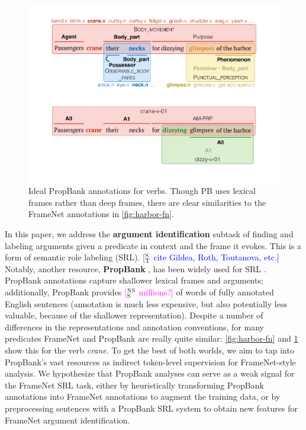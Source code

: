\documentclass[11pt,a4paper]{article}
\newcommand{\ensuretext}[1]{#1}
\newcommand{\nssmarker}{\ensuretext{\textcolor{magenta}{\ensuremath{^{\textsc{NS}}_{\textsc{S}}}}}}
\newcommand{\stmarker}{\ensuretext{\textcolor{blue}{\ensuremath{^{\textsc{S}}_{\textsc{T}}}}}}
\newcommand{\arkcomment}[3]{\ensuretext{\textcolor{#3}{[#1 #2]}}}
\newcommand{\nss}[1]{\arkcomment{\nssmarker}{#1}{magenta}}
\newcommand{\st}[1]{\arkcomment{\stmarker}{#1}{blue}}
\begin{document}
\begin{figure}
\includegraphics[width=\columnwidth]{fig/harbor-pb.pdf}
\caption{Ideal PropBank annotations for verbs. Though PB uses lexical frames rather than deep frames,
there are clear similarities to the FrameNet annotations in \cref{fig:harbor-fn}.}
\label{fig:harbor-pb}
\end{figure}

In this paper, we address the \textbf{argument identification} 
subtask of finding and labeling arguments 
given a predicate in context and the frame it evokes.
This is a form of semantic role labeling (SRL).
\st{cite Gildea, Roth, Toutanova, etc.}
Notably, another resource, \textbf{PropBank} \citep{propbank}, has been widely used for SRL \citep{palmer-10}. 
PropBank annotations capture shallower lexical frames and arguments; 
additionally, PropBank provides \nss{millions?} of words of fully annotated English sentences
(annotation is much less expensive, but also potentially less valuable, because of the shallower representation).
Despite a number of differences in the representations and annotation conventions, 
for many predicates FrameNet and PropBank are really quite similar: 
\cref{fig:harbor-fn} and \cref{fig:harbor-pb} show this for the verb \textit{crane}.
To get the best of both worlds, we aim to tap into PropBank's vast resources 
as indirect token-level supervision for FrameNet-style analysis. 
We hypothesize that PropBank analyses can serve as a weak signal for the FrameNet SRL task, 
either by heuristically transforming PropBank annotations into FrameNet annotations 
to augment the training data, or by preprocessing sentences with a PropBank SRL system to obtain new features 
for FrameNet argument identification.
\end{document}
